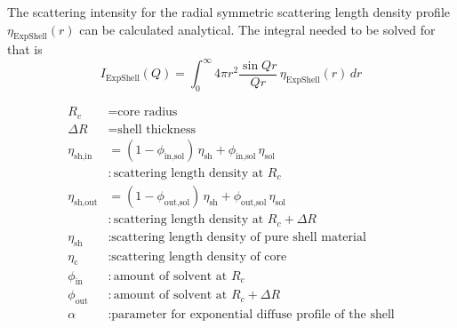 The scattering intensity for the radial symmetric scattering length density profile $\eta_\text{ExpShell}(r)$
can be calculated analytical. The integral needed to be solved for that is
\begin{equation}
I_\text{ExpShell}(Q) = \int_0^\infty 4\pi r^2 \frac{\sin Qr}{Qr}\, \eta_\text{ExpShell}(r)\, dr
\end{equation}

\begin{align}
R_c &=\text{core radius} \nonumber\\
\Delta R &=\text{shell thickness} \nonumber\\
\eta_\text{sh,in}  & = (1 - \phi_\text{in,sol})  \, \eta_\text{sh} + \phi_\text{in,sol} \,\eta_\text{sol} \\
                    & : \text{scattering length density at $R_c$} \nonumber \\
\eta_\text{sh,out}     & = (1 - \phi_\text{out,sol}) \, \eta_\text{sh} + \phi_\text{out,sol}\,\eta_\text{sol} \\
                        & : \text{scattering length density at $R_c+\Delta R$} \nonumber \\
\eta_\text{sh}      & : \text{scattering length density of pure shell material} \nonumber \\
\eta_\text{c}       & : \text{scattering length density of core} \nonumber \\
\phi_\text{in}     & : \text{amount of solvent  at $R_c$} \nonumber \\
\phi_\text{out}    & : \text{amount of solvent at $R_c+\Delta R$} \nonumber \\
\alpha             & : \text{parameter for exponential diffuse profile of the shell} \\
\nonumber
\end{align}


\vspace{5mm}

